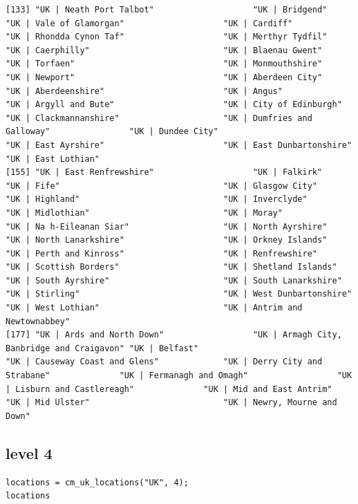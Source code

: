 \documentclass[11pt]{article}
\begin{document}
\begin{verbatim}
[133] "UK | Neath Port Talbot"                    "UK | Bridgend"                             "UK | Vale of Glamorgan"                    "UK | Cardiff"                              "UK | Rhondda Cynon Taf"                    "UK | Merthyr Tydfil"                       "UK | Caerphilly"                           "UK | Blaenau Gwent"                        "UK | Torfaen"                              "UK | Monmouthshire"                        "UK | Newport"                              "UK | Aberdeen City"                        "UK | Aberdeenshire"                        "UK | Angus"                                "UK | Argyll and Bute"                      "UK | City of Edinburgh"                    "UK | Clackmannanshire"                     "UK | Dumfries and Galloway"                "UK | Dundee City"                          "UK | East Ayrshire"                        "UK | East Dunbartonshire"                  "UK | East Lothian"                        
[155] "UK | East Renfrewshire"                    "UK | Falkirk"                              "UK | Fife"                                 "UK | Glasgow City"                         "UK | Highland"                             "UK | Inverclyde"                           "UK | Midlothian"                           "UK | Moray"                                "UK | Na h-Eileanan Siar"                   "UK | North Ayrshire"                       "UK | North Lanarkshire"                    "UK | Orkney Islands"                       "UK | Perth and Kinross"                    "UK | Renfrewshire"                         "UK | Scottish Borders"                     "UK | Shetland Islands"                     "UK | South Ayrshire"                       "UK | South Lanarkshire"                    "UK | Stirling"                             "UK | West Dunbartonshire"                  "UK | West Lothian"                         "UK | Antrim and Newtownabbey"             
[177] "UK | Ards and North Down"                  "UK | Armagh City, Banbridge and Craigavon" "UK | Belfast"                              "UK | Causeway Coast and Glens"             "UK | Derry City and Strabane"              "UK | Fermanagh and Omagh"                  "UK | Lisburn and Castlereagh"              "UK | Mid and East Antrim"                  "UK | Mid Ulster"                           "UK | Newry, Mourne and Down"
\end{verbatim}

\subsection{level 4}
\label{sec:orgc5dd48f}
\begin{verbatim}
locations = cm_uk_locations("UK", 4);
locations
\end{verbatim}
\end{document}
